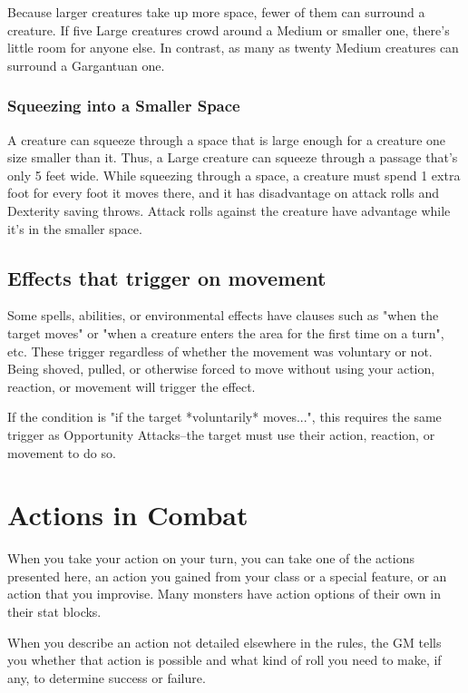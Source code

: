 Because larger creatures take up more space, fewer of them can surround a creature. If five Large creatures crowd around a Medium or smaller one, there's little room for anyone else. In contrast, as many as twenty Medium creatures can surround a Gargantuan one.

\subsubsection{Squeezing into a Smaller Space}

A creature can squeeze through a space that is large enough for a creature one size smaller than it. Thus, a Large creature can squeeze through a passage that's only 5 feet wide. While squeezing through a space, a creature must spend 1 extra foot for every foot it moves there, and it has disadvantage on attack rolls and Dexterity saving throws. Attack rolls against the creature have advantage while it's in the smaller space.

\subsection{Effects that trigger on movement}
Some spells, abilities, or environmental effects have clauses such as "when the target moves" or "when a creature enters the area for the first time on a turn", etc. These trigger regardless of whether the movement was voluntary or not. Being shoved, pulled, or otherwise forced to move without using your action, reaction, or movement will trigger the effect.

If the condition is "if the target *voluntarily* moves...", this requires the same trigger as Opportunity Attacks--the target must use their action, reaction, or movement to do so.

\section{Actions in Combat}

When you take your action on your turn, you can take one of the actions presented here, an action you gained from your class or a special feature, or an action that you improvise. Many monsters have action options of their own in their stat blocks.

When you describe an action not detailed elsewhere in the rules, the GM tells you whether that action is possible and what kind of roll you need to make, if any, to determine success or failure.

